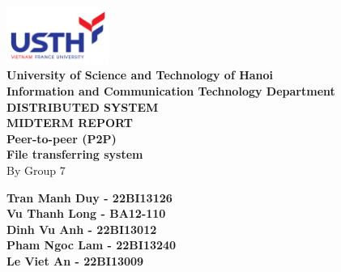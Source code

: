 \documentclass[a4paper,12pt]{article}
\begin{document}
\begin{titlepage}
\centering
\includegraphics[width=0.25\textwidth]{3.Logo USTH.png}\\[1cm]
\textbf{\large University of Science and Technology of Hanoi}\\
\textbf{\large Information and Communication Technology Department}\\[2cm]

{\LARGE \textbf{DISTRIBUTED SYSTEM}}\\[0.5cm]
{\LARGE \textbf{MIDTERM REPORT}}\\[1.5cm]

{\Huge \textbf{Peer-to-peer (P2P)}}\\
{\Huge \textbf{File transferring system}}\\[2cm]

{\Large By Group 7}\\[1cm]

\begin{center}
    \textbf{Tran Manh Duy - 22BI13126}\\
    \textbf{Vu Thanh Long - BA12-110}\\
    \textbf{Dinh Vu Anh - 22BI13012}\\
    \textbf{Pham Ngoc Lam - 22BI13240}\\
    \textbf{Le Viet An - 22BI13009}\\[1cm]
\end{center}

\vfill

\end{titlepage}

\tableofcontents
\newpage






\end{document}
